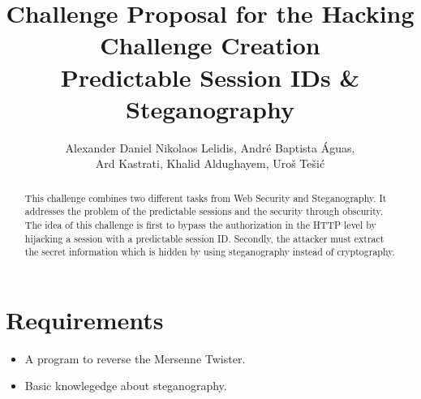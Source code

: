 \documentclass[11pt]{article}
\title{\vspace{-1.7cm}Challenge Proposal for the Hacking Challenge Creation
\\[0.3in]
\bfseries Predictable Session IDs \& Steganography
\\[0.1in]
}
\author{Alexander Daniel Nikolaos Lelidis, Andr\'{e} Baptista \'{A}guas, \\ Ard Kastrati, Khalid Aldughayem, Uro\v{s} Te\v{s}i\'{c}}
\begin{document}
\maketitle

\begin{abstract}
This challenge combines two different tasks from Web Security and Steganography. It addresses the problem of the predictable sessions and the security through obscurity. The idea of this challenge is first to bypass the authorization in the HTTP level by hijacking a session with a predictable session ID. Secondly, the attacker must extract the secret information which is hidden by using steganography instead of cryptography. 
\end{abstract}


\section{Requirements}
\begin{itemize}
\item A program to reverse the Mersenne Twister.
\item Basic knowlegedge about steganography.
\end{itemize}
\end{document}
